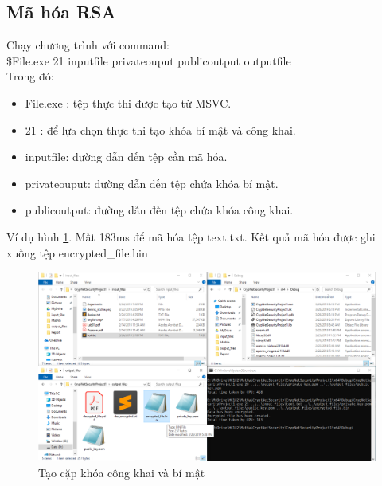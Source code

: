 \documentclass[a4paper]{article}
\begin{document}
    \subsection{Mã hóa RSA}
    Chạy chương trình với command:\\
    \$File.exe 21 inputfile  privateouput publicoutput outputfile\\
    Trong đó:
    \begin{itemize}
        \item File.exe : tệp thực thi được tạo từ MSVC.
        \item 21 : để lựa chọn thực thi tạo khóa bí mật và công khai.
        \item inputfile: đường dẫn đến tệp cần mã hóa.
        \item privateouput: đường dẫn đến tệp chứa khóa bí mật.
        \item publicoutput: đường dẫn đến tệp chứa khóa công khai.
    \end{itemize}
    Ví dụ hình \ref{fig:rsaen}. Mất 183ms để mã hóa tệp text.txt. Kết quả mã hóa được ghi xuống tệp encrypted\_file.bin
    \begin{figure}[htp]
        \centering
        \includegraphics[scale=0.4]{rsaen.png}
        \caption{Tạo cặp khóa công khai và bí mật}
        \label{fig:rsaen}
    \end{figure}
\end{document}
